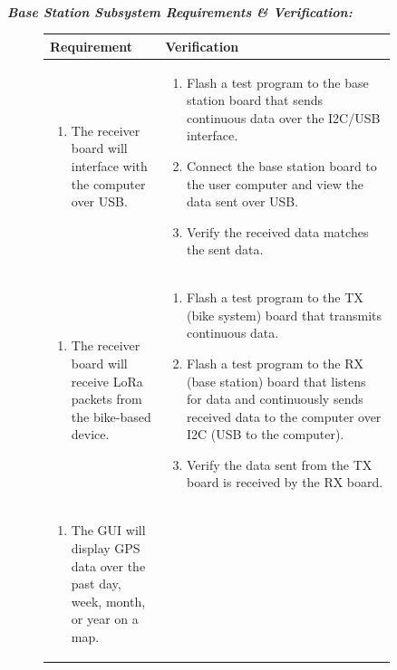 \documentclass{article}
\begin{document}
\paragraph{} 


\textit{\textbf{Base Station Subsystem Requirements \& Verification:}}

\begin{figure}[H]
	\begin{center}
		\begin{tabular}{|p{0.3 \linewidth}|p{0.6 \linewidth}|}
			\hline
			Requirement & Verification  \\
			\hline 
			\begin{enumerate}
				\item  The receiver board will interface with the computer over USB.
			\end{enumerate}  & \begin{enumerate}
				\item Flash a test program to the base station board that sends continuous data over the I2C/USB interface.
				\item Connect the base station board to the user computer and view the data sent over USB. 
				\item Verify the received data matches the sent data. 
			\end{enumerate} \\
			\hline
			\begin{enumerate}
				\item The receiver board will receive LoRa packets from the bike-based device. 
			\end{enumerate}  & \begin{enumerate}
				\item Flash a test program to the TX (bike system) board that transmits continuous data. 
				\item Flash a test program to the RX (base station) board that listens for data and continuously sends received data to the computer over I2C (USB to the computer). 
				\item Verify the data sent from the TX board is received by the RX board.
			\end{enumerate} \\
			\hline
			\begin{enumerate}
				\item The GUI will display GPS data over the past day, week, month, or year on a map. 
			\end{enumerate}  & \begin{enumerate}

\end{enumerate}
\end{tabular}
\end{center}
\end{figure}
\end{document}
